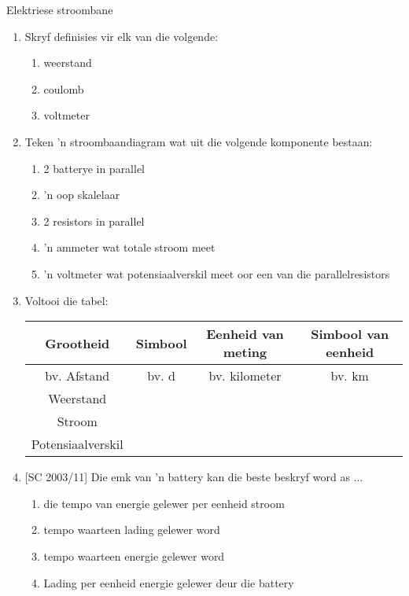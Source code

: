 \begin{eocexercises}{Elektriese stroombane}

\begin{enumerate}[noitemsep, label=\textbf{\arabic*}. ] 
\item{ Skryf definisies vir elk van die volgende:
  \begin{enumerate}[noitemsep, label=\textbf{\alph*}. ] 
  \item weerstand
  \item coulomb
  \item voltmeter
  \end{enumerate}}

\item{ Teken 'n stroombaandiagram wat uit die volgende komponente bestaan:
  \begin{enumerate}[noitemsep, label=\textbf{\alph*}. ] 
  \item 2 batterye in parallel
  \item 'n oop skalelaar
  \item 2 resistors in parallel
  \item 'n ammeter wat totale stroom meet
  \item 'n voltmeter wat potensiaalverskil meet oor een van die
parallelresistors
  \end{enumerate}}

\item{ Voltooi die tabel: \\

\begin{tabular}{ | c | c | c | c| } \hline 
\textbf{Grootheid} & \textbf{Simbool} & \textbf{Eenheid van meting} &
\textbf{Simbool van eenheid} \\ \hline \hline 
bv. Afstand & bv. d & bv. kilometer & bv. km \\ \hline 
Weerstand &   &   &  \\ \hline
Stroom  &   &   &  \\ \hline
Potensiaalverskil  &   &   &  \\ \hline
\hline
\end{tabular}
}

\item{[SC 2003/11] Die emk van 'n battery kan die beste beskryf word as $\dots$
\begin{enumerate}[noitemsep, label=\textbf{\alph*}. ] 
\item{die tempo van energie gelewer per eenheid stroom}
\item{tempo waarteen lading gelewer word}
\item{tempo waarteen energie gelewer word}
\item{Lading per eenheid energie gelewer deur die battery}
\end{enumerate}}


\end{enumerate}
\end{eocexercises}
